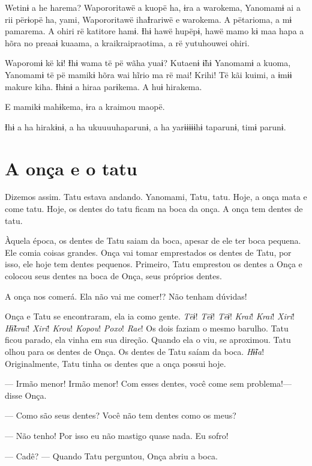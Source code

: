 Wetinɨ a he harema? Wapororitawë a kuopë ha, ɨra a warokema, Yanomamɨ ai
a rii përɨopë ha, yami, Wapororitawë ihaƗrariwë e warokema. A pëtarioma,
a mɨ pamarema. A ohiri rë katitore hamɨ. Ɨhɨ hawë hupëpɨ, hawë mamo kɨ
maa hapa a hõra no preaaɨ kuaama, a kraikraipraotima, a rë yutuhouwei
ohiri. 

Waporomɨ kë kɨ! Ɨhɨ wama të pë wãha yuaɨ? Kutaenɨ ɨ̃hɨ Yanomamɨ a kuoma,
Yanomamɨ të pë mamikɨ hõra wai hĩrio ma rë mai! Krihi! Të kãi kuimi, a
ɨmɨɨ makure kiha. Ɨhɨnɨ a hiraa parɨkema. A huɨ hirakema. 

E mamikɨ mahɨkema, ɨra a kraimou maopë. 

Ɨhɨ a ha hirakɨnɨ, a ha ukuuuuhaparunɨ, a ha yarɨɨɨɨɨhɨ taparunɨ, timɨ
parunɨ. 

\chapter{A onça e o tatu}
 
 Dizemos assim. Tatu estava andando. Yanomami, Tatu, tatu.
Hoje, a onça mata e come tatu. Hoje, os dentes do tatu ficam na boca da
onça. A onça tem dentes de tatu. 

Àquela época, os dentes de Tatu saiam da boca, apesar de ele ter boca
pequena. Ele comia coisas grandes. Onça vai tomar emprestados os dentes
de Tatu, por isso, ele hoje tem dentes pequenos. Primeiro, Tatu
emprestou os dentes a Onça e colocou seus dentes na boca de Onça, seus
próprios dentes. 

A onça nos comerá. Ela não vai me comer!? Não tenham dúvidas! 

Onça e Tatu se encontraram, ela ia como gente. \textit{Tëɨ}! \textit{Tëɨ}! \textit{Tëɨ}! \textit{Krai}!
\textit{Krai}! \textit{Xiri}! \textit{Hɨ̃krai}! \textit{Xiri}! \textit{Krou}! \textit{Kopou}! \textit{Poxo}! \textit{Rae}! Os dois faziam o mesmo
barulho. Tatu ficou parado, ela vinha em sua direção. Quando ela o viu, se
aproximou. Tatu olhou para os dentes de Onça. Os dentes de Tatu saíam da
boca. \textit{Hɨ̃ɨa}! Originalmente, Tatu tinha os dentes que a onça possui hoje. 

--- Irmão menor! Irmão menor! Com esses dentes, você come sem
problema!--- disse Onça. 

--- Como são seus dentes? Você não tem dentes como os meus?

--- Não tenho! Por isso eu não mastigo quase nada. Eu sofro! 

--- Cadê? --- Quando Tatu perguntou, Onça abriu a boca. 

